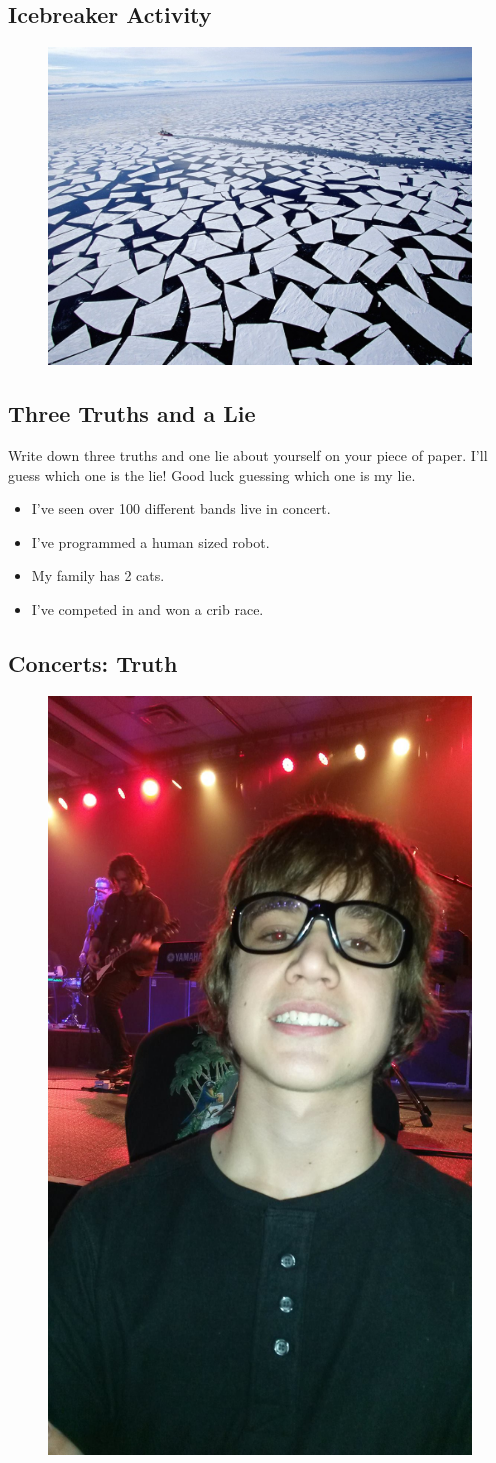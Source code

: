 \clearpage 
\subsection{Icebreaker Activity}

\begin{figure}[h]
	\centering\includegraphics[width=0.5\linewidth]{images/icebreaker.jpg}
\end{figure}

\clearpage

\subsection*{Three Truths and a Lie}

Write down three truths and one lie about yourself on your piece of paper.  I'll guess which one is the lie!  
Good luck guessing which one is my lie.

\begin{itemize}
	\item I've seen over 100 different bands live in concert.
	\item I've programmed a human sized robot.  
	\item My family has 2 cats.  
	\item I've competed in and won a crib race.  
\end{itemize}

\clearpage

\subsection*{Concerts:  \color{green} Truth}

\begin{figure}[h]
	\centering\includegraphics[width=0.23\linewidth]{images/concert1.jpg}
\end{figure}

